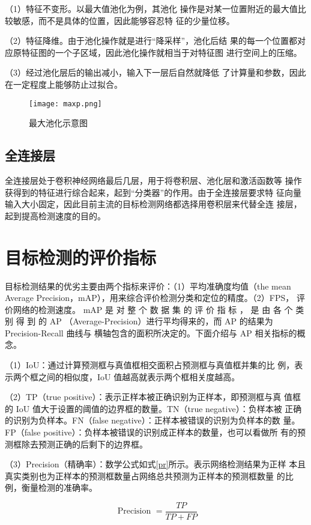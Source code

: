 （1）特征不变形。以最大值池化为例，其池化
操作是对某一位置附近的最大值比较敏感，而不是具体的位置，因此能够容忍特
征的少量位移。

（2）特征降维。由于池化操作就是进行“降采样”，池化后结
果的每一个位置都对应原特征图的一个子区域，因此池化操作就相当于对特征图
进行空间上的压缩。

（3）经过池化层后的输出减小，输入下一层后自然就降低
了计算量和参数，因此在一定程度上能够防止过拟合\cite{gu2018recent}。

\begin{figure}[htbp]
    \centering
    \texttt{[image: maxp.png]}
    \caption{最大池化示意图}
    \label{maxp}
\end{figure}

\subsection{全连接层}
全连接层处于卷积神经网络最后几层，用于将卷积层、池化层和激活函数等
操作获得到的特征进行综合起来，起到“分类器”的作用。由于全连接层要求特
征向量输入大小固定，因此目前主流的目标检测网络都选择用卷积层来代替全连
接层，起到提高检测速度的目的。

\section{目标检测的评价指标}
目标检测结果的优劣主要由两个指标来评价：（1）平均准确度均值（the mean
Average Precision，mAP），用来综合评价检测分类和定位的精度。（2）FPS，
评价网络的检测速度。
mAP 是 对 整 个 数 据 集 的 评 价 指 标 ， 是 由 各 个 类 别 得 到 的 AP
（Average-Precision）进行平均得来的，而 AP 的结果为 Precision-Recall 曲线与
横轴包含的面积所决定的。下面介绍与 AP 相关指标的概念。

（1）IoU：通过计算预测框与真值框相交面积占预测框与真值框并集的比
例，表示两个框之间的相似度，IoU 值越高就表示两个框相关度越高。

（2）TP（true positive）：表示正样本被正确识别为正样本，即预测框与真
值框的 IoU 值大于设置的阈值的边界框的数量。TN（true negative）：负样本被
正确的识别为负样本。FN（false negative）：正样本被错误的识别为负样本的数
量。FP（false positive）：负样本被错误的识别成正样本的数量，也可以看做所
有的预测框除去预测正确的后剩下的边界框。

（3）Precision（精确率）：数学公式如式\ref{pr}所示。表示网络检测结果为正样
本且真实类别也为正样本的预测框数量占网络总共预测为正样本的预测框数量
的比例，衡量检测的准确率。

\begin{equation}
     \text { Precision }=\frac{T P}{T P+F P}
    \label{pr}
\end{equation}

